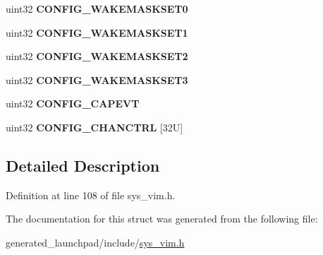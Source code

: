 \begin{DoxyCompactItemize}
\item 
\mbox{\label{structvim__config__reg_a07c5838b93ce6e5c17d6921d04873b7c}} 
uint32 {\bfseries C\+O\+N\+F\+I\+G\+\_\+\+W\+A\+K\+E\+M\+A\+S\+K\+S\+E\+T0}
\item 
\mbox{\label{structvim__config__reg_a3cb3bdd92029f737d7358e8fa844163f}} 
uint32 {\bfseries C\+O\+N\+F\+I\+G\+\_\+\+W\+A\+K\+E\+M\+A\+S\+K\+S\+E\+T1}
\item 
\mbox{\label{structvim__config__reg_a2c84c65b62ae3d39755bf9dc6a288e44}} 
uint32 {\bfseries C\+O\+N\+F\+I\+G\+\_\+\+W\+A\+K\+E\+M\+A\+S\+K\+S\+E\+T2}
\item 
\mbox{\label{structvim__config__reg_aa24a55fc5919f19efb3a1d5c91da5b28}} 
uint32 {\bfseries C\+O\+N\+F\+I\+G\+\_\+\+W\+A\+K\+E\+M\+A\+S\+K\+S\+E\+T3}
\item 
\mbox{\label{structvim__config__reg_a435dd514ad9880b5feb338d620b79ab5}} 
uint32 {\bfseries C\+O\+N\+F\+I\+G\+\_\+\+C\+A\+P\+E\+VT}
\item 
\mbox{\label{structvim__config__reg_a236bc0f22c9fc92e7539fcf2435a3ce3}} 
uint32 {\bfseries C\+O\+N\+F\+I\+G\+\_\+\+C\+H\+A\+N\+C\+T\+RL} \mbox{[}32\+U\mbox{]}
\end{DoxyCompactItemize}


\subsection{Detailed Description}


Definition at line 108 of file sys\+\_\+vim.\+h.



The documentation for this struct was generated from the following file\+:\begin{DoxyCompactItemize}
\item 
generated\+\_\+launchpad/include/\mbox{\hyperlink{sys__vim_8h}{sys\+\_\+vim.\+h}}\end{DoxyCompactItemize}
